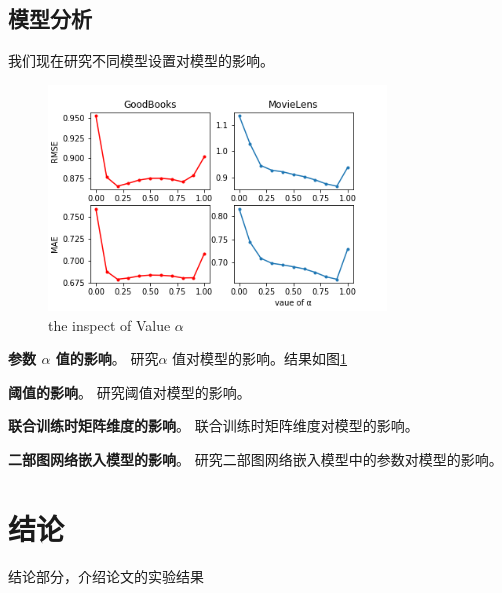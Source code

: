 \documentclass[lang=cn,11pt]{elegantpaper}
\begin{document}
\subsection{模型分析}

我们现在研究不同模型设置对模型的影响。

\begin{figure}[htbp]
	\centering
	\includegraphics[width=0.8\textwidth]{imgs/alpha.png}
	\caption{the inspect of Value $ \alpha $ \label{fig:alpha}}
\end{figure}


\textbf{参数 $ \alpha $ 值的影响}。 研究$ \alpha $ 值对模型的影响。结果如图\ref{fig:alpha}

\textbf{阈值的影响}。 研究阈值对模型的影响。

\textbf{联合训练时矩阵维度的影响}。 联合训练时矩阵维度对模型的影响。

\textbf{二部图网络嵌入模型的影响}。 研究二部图网络嵌入模型中的参数对模型的影响。

\section{结论}
结论部分，介绍论文的实验结果




\end{document}

